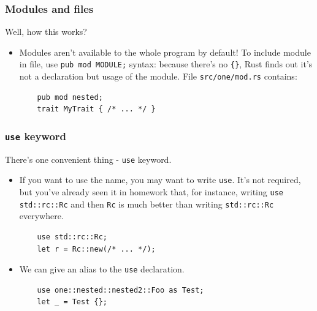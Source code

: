 \documentclass[aspectratio=1610,t]{beamer}
\begin{document}
\begin{frame}[fragile]
\frametitle{Modules and files}
Well, how this works?

\begin{itemize}
    \item<1-> Modules aren't available to the whole program by default! To include module in file, use \texttt{pub mod MODULE;} syntax: because there's no \texttt{\{\}}, Rust finds out it's not a declaration but usage of the module. File \texttt{src/one/mod.rs} contains:

    \begin{verbatim}
    pub mod nested;
    trait MyTrait { /* ... */ }
    \end{verbatim}
\end{itemize}
\end{frame}


\begin{frame}[fragile]
\frametitle{\texttt{use} keyword}
There's one convenient thing - \texttt{use} keyword.

\begin{itemize}
    \item<1-> If you want to use the name, you may want to write \texttt{use}. It's not required, but you've already seen it in homework that, for instance, writing \texttt{use std::rc::Rc} and then \texttt{Rc} is much better than writing \texttt{std::rc::Rc} everywhere.

    \begin{verbatim}
    use std::rc::Rc;
    let r = Rc::new(/* ... */);
    \end{verbatim}

    \item<2-> We can give an alias to the \texttt{use} declaration.

    \begin{verbatim}
    use one::nested::nested2::Foo as Test;
    let _ = Test {};
    \end{verbatim}
\end{itemize}
\end{frame}

\end{document}
